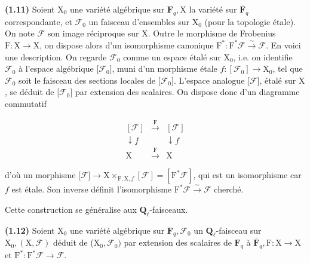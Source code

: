 \documentclass[10pt,leqno]{article}
\begin{document}
\noindent \textbf{(1.11)} Soient \(\mathrm{X}_{0}\) une variété algébrique sur \(\mathbf{F}_{q}, \mathrm{X}\) la variété sur \(\overline{\mathbf{F}}_{q}\) correspondante, et \(\mathcal{F} _{0}\) un faisceau d’ensembles sur \(\mathrm{X}_{0}\) (pour la topologie étale). On note \(\mathcal{F} \) son image réciproque sur \(\mathrm{X}\). Outre le morphisme de Frobenius \(\mathrm{F} : \mathrm{X}\longrightarrow \mathrm{X}\), on dispose alors d’un isomorphisme canonique \(\mathrm{F}^{*} : \mathrm{F}^{*}\mathcal{F}  \xrightarrow{\sim } \mathcal{F} \). En voici une description. On regarde \(\mathcal{F} _{0}\) comme un espace étalé sur \(\mathrm{X}_{0}\), i.e. on identifie \(\mathcal{F} _{0}\) à l’espace algébrique [\(\mathcal{F} _{0}]\), muni d’un morphisme étale \(f : [\mathcal{F} _{0}]\longrightarrow \mathrm{X}_{0}\), tel que \(\mathcal{F} _{0}\) soit le faisceau des sections locales de [\(\mathcal{F} _{0}]\). L’espace analogue [\(\mathcal{F} ]\), étalé sur \(\mathrm{X}\), se déduit de [\(\mathcal{F} _{0}]\) par extension des scalaires. On dispose donc d’un diagramme commutatif\par

\[\begin{array}{ccc}[\mathcal F]&\xrightarrow{\mathrm F}&[\mathcal F]\\ \downarrow\!f&&\downarrow\!f\\ \mathrm X&\xrightarrow{\mathrm F}&\mathrm X\end{array}\]

\noindent d’où un morphisme [\(\mathcal{F} ]\longrightarrow \mathrm{X}\times _{\mathrm{F},\mathrm{X},f}[\mathcal{F} ]=[\mathrm{F}^{*}\mathcal{F} ]\), qui est un isomorphisme car \(f\) est étale. Son inverse définit l’isomorphisme \(\mathrm{F}^{*}\mathcal{F}  \xrightarrow{\sim } \mathcal{F} \) cherché.\par

\noindent Cette construction se généralise aux \(\mathbf{Q}_{\ell }\)-faisceaux.\par

\noindent \textbf{(1.12)} Soient \(\mathrm{X}_{0}\) une variété algébrique sur \(\mathbf{F}_{q}, \mathcal{F} _{0}\) un \(\mathbf{Q}_{\ell }\)-faisceau sur \(\mathrm{X}_{0}, (\mathrm{X},\mathcal{F} )\) déduit de (\(\mathrm{X}_{0},\mathcal{F} _{0})\) par extension des scalaires de \(\mathbf{F}_{q}\) à \(\overline{\mathbf{F}}_{q}, \mathrm{F} : \mathrm{X}\longrightarrow \mathrm{X}\) et \(\mathrm{F}^{*} : \mathrm{F}^{*}\mathcal{F} \longrightarrow \mathcal{F} \).\par
\end{document}
